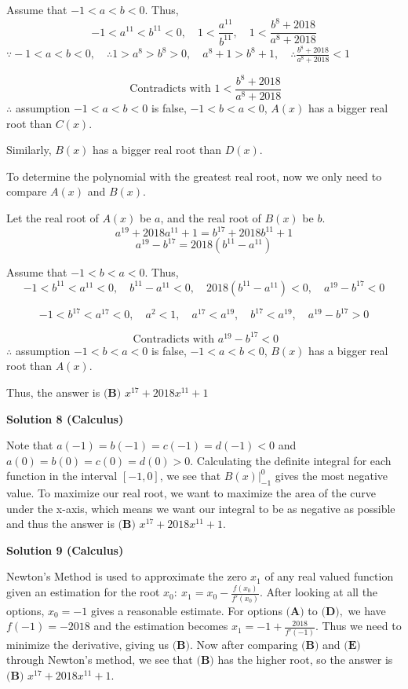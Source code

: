 \begin{enumerate}
 Assume that $-1<a<b<0$. Thus, 
 \[-1<a^{11}<b^{11}<0, \quad 1<\frac{ a^{11} }{ b^{11} }, \quad 1< \frac{ b^8+2018 }{ a^8+2018 }\]
$\because -1<a<b<0, \quad \therefore 1>a^8>b^8>0, \quad a^8 + 1 > b^8+1, \quad \therefore \frac{b^8+2018}{a^8+2018}<1$

 \[\text{ Contradicts with } 1<\frac{b^8+2018}{a^8+2018}\]
$\therefore$ assumption $-1<a<b<0$ is false, $-1<b<a<0$, $A(x)$ has a bigger real root than $C(x)$.

 Similarly, $B(x)$ has a bigger real root than $D(x)$.

 To determine the polynomial with the greatest real root, now we only need to compare $A(x)$ and $B(x)$.

 Let the real root of $A(x)$ be $a$, and the real root of $B(x)$ be $b$.
 \[a^{19}+2018a^{11}+1 = b^{17}+2018b^{11}+1\]
 \[a^{19} - b^{17} = 2018( b^{11} - a^{11} )\]

 Assume that $-1<b<a<0$. Thus, 
 \[-1<b^{11}<a^{11}<0, \quad b^{11}-a^{11}<0, \quad 2018( b^{11} - a^{11} ) < 0, \quad a^{19} - b^{17} < 0\]

 \[-1<b^{17}<a^{17}<0, \quad a^2<1, \quad a^{17}<a^{19}, \quad b^{17}<a^{19}, \quad a^{19} - b^{17} > 0\]

 \[\text{ Contradicts with }a^{19} - b^{17} < 0\]
$\therefore$ assumption $-1<b<a<0$ is false, $-1<a<b<0$, $B(x)$ has a bigger real root than $A(x)$.

 Thus, the answer is $\boxed{\textbf{(B) }   x^{17}+2018x^{11}+1}$




\textbf{Solution 8 (Calculus)}

Note that $a(-1)=b(-1)=c(-1)=d(-1) < 0$ and $a(0)=b(0)=c(0)=d(0) > 0$. Calculating the definite integral for each function in the interval $[-1,0]$, we see that $B(x)\rvert^{0}_{-1}$ gives the most negative value. To maximize our real root, we want to maximize the area of the curve under the x-axis, which means we want our integral to be as negative as possible and thus the answer is $\boxed{\textbf{(B) }   x^{17}+2018x^{11}+1}$.

 



\textbf{Solution 9 (Calculus)}

Newton's Method is used to approximate the zero $x_{1}$ of any real valued function given an estimation for the root $x_{0}: \ x_{1}=x_{0}-{\frac {f(x_{0})}{f'(x_{0})}}.$ After looking at all the options, $x_{0}=-1$ gives a reasonable estimate. For options $\textbf{(A)}$ to $\textbf{(D)},$ we have $f(-1) = -2018$ and the estimation becomes $x_{1}=-1+{\frac {2018}{f'(-1)}}.$ Thus we need to minimize the derivative, giving us $\textbf{(B)}$. Now after comparing $\textbf{(B)}$ and $\textbf{(E)}$ through Newton's method, we see that $\textbf{(B)}$ has the higher root, so the answer is $\boxed{\textbf{(B) }   x^{17}+2018x^{11}+1}$.


\end{enumerate}
